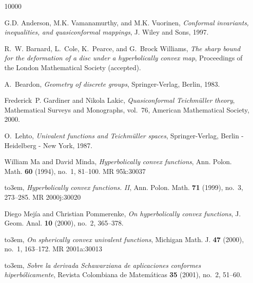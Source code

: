 \documentclass[12pt]{icgft}
\theoremstyle{definition}
\numberwithin{equation}{section}
\begin{document}
\vspace{0.1in}

% 

\def\cprime{$'$}
\providecommand{\bysame}{\leavevmode\hbox to3em{\hrulefill}\thinspace}
\providecommand{\MR}{\relax\ifhmode\unskip\space\fi MR }
\providecommand{\MRhref}[2]{%
  \href{http://www.ams.org/mathscinet-getitem?mr=#1}{#2}
}
\providecommand{\href}[2]{#2}


\begin{thebibliography}{10000}

G.D. Anderson, M.K. Vamanamurthy, and M.K. Vuorinen, \emph{Conformal
  invariants, inequalities, and quasiconformal mappings}, J. Wiley and Sons,
  1997.

R.~W. Barnard, L.~Cole, K.~Pearce, and G.~Brock Williams, \emph{The sharp bound
  for the deformation of a disc under a hyperbolically convex map}, Proceedings
  of the London Mathematical Society (accepted).

A.~Beardon, \emph{Geometry of discrete groups}, Springer-Verlag, Berlin, 1983.

Frederick~P. Gardiner and Nikola Lakic, \emph{Quasiconformal {T}eichm\"uller
  theory}, Mathematical Surveys and Monographs, vol.~76, American Mathematical
  Society, 2000.

O.~Lehto, \emph{Univalent functions and {T}eichm\"uller spaces},
  Springer-Verlag, Berlin - Heidelberg - New York, 1987.

William Ma and David Minda, \emph{Hyperbolically convex functions}, Ann. Polon.
  Math. \textbf{60} (1994), no.~1, 81--100. \MR{95k:30037}

\bysame, \emph{Hyperbolically convex functions. {II}}, Ann. Polon. Math.
  \textbf{71} (1999), no.~3, 273--285. \MR{2000j:30020}

Diego Mej\'ia and Christian Pommerenke, \emph{On hyperbolically convex
  functions}, J. Geom. Anal. \textbf{10} (2000), no.~2, 365--378.

\bysame, \emph{On spherically convex univalent functions}, Michigan Math. J.
  \textbf{47} (2000), no.~1, 163--172. \MR{2001a:30013}

\bysame, \emph{Sobre la derivada {Schawarziana} de aplicaciones conformes
  hiperb\'olicamente}, Revista Colombiana de Matem\'aticas \textbf{35} (2001),
  no.~2, 51--60.


\end{thebibliography}
\end{document}
